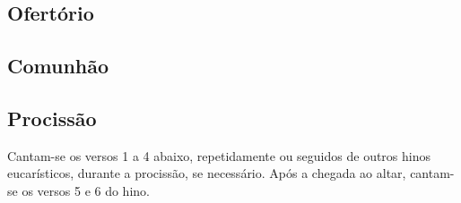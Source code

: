 \AllowPageFlush

\subsection{Ofertório}\label{subsection:tempus-per-annum/sanctissimi-corporis-et-sanguinis-christi/psalmi-ad-offertorium}

\AllowPageFlush

\subsection{Comunhão}\label{subsection:tempus-per-annum/sanctissimi-corporis-et-sanguinis-christi/psalmi-ad-communionem}

\subsection{Procissão}\label{subsection:tempus-per-annum/sanctissimi-corporis-et-sanguinis-christi/ad-processionem}
\begin{rubrica}
  Cantam-se os versos 1 a 4 abaixo, repetidamente ou seguidos de outros hinos eucarísticos, durante a procissão, se necessário. Após a chegada ao altar, cantam-se os versos 5 e 6 do hino.
\end{rubrica}
